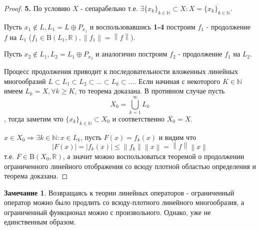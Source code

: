 \documentclass[12pt,a4paper]{article}
\theoremstyle{definition}
\newtheorem{corollaryth}{Замечание}[theorem]
\newcommand{\Real}{\mathbb{R}}
\newcommand{\Natural}{\mathbb{N}}
\newcommand{\norm}[1]{\left\lVert#1\right\rVert}
\newcommand{\bounded}[2]{\textrm{B}(#1, #2)}
\newcommand{\seq}[2]{\{#1\}_{#2}}
\begin{document}
\begin{proof}
	\textbf{5.} По условию $X$ - сепарабельно т.е. $\exists \seq{x_k}{k \in \Natural} \subset X: X = \overline{\seq{x_k}{k \in \Natural}}$. \newline
	
	\noindent Пусть $x_1 \notin L, L_1 = L \oplus P_{x_1}$ и воспользовавшись \textbf{1-4} построим $f_1$ - продолжение $f$ на $L_1$ ($f_1 \in \bounded{L_1}{\Real}, \norm{f_1} = \norm{f}$). \newline
	
	\noindent Пусть $x_2 \notin L_1, L_2 = L_1 \oplus P_{x_2}$ и аналогично построим $f_2$ - продолжение $f_1$ на $L_2$. \newline
	
	\noindent Процесс продолжения приводит к последовательности вложенных линейных многообразий $L \subset L_1 \subset L_2 \subset ... \subset L_k \subset ...$. Если начиная с некоторого $K \in \Natural$ имеем $L_k = X, \forall k \geq K$, то теорема доказана. В противном случае пусть $$X_0 = \bigcup_{k=1}^{\infty}{L_k}$$, тогда заметим что $\seq{x_k}{k \in \Natural} \subset X_0$ и соответственно $\overline{X_0} = X$. \newline
	
	\noindent $x \in X_0 \Rightarrow \exists k \in \Natural: x \in L_k$, пусть $F(x) = f_k (x)$ и видим что $$|F(x)| = |f_k (x)| \leq \norm{f_k}\norm{x} = \norm{f}\norm{x}$$ т.е. $F \in \bounded{X_0}{\Real}$, а значит можно воспользоваться теоремой о продолжении ограниченного линейного отображения со всюду плотной областью определения и теорема доказана. 
\end{proof}

\begin{corollaryth}
	Возвращаясь к теории линейных операторов - ограниченный оператор можно было продлить со всюду-плотного линейного многообразия, а ограниченный функционал можно с произвольного. Однако, уже не единственным образом.
\end{corollaryth}
\end{document}
